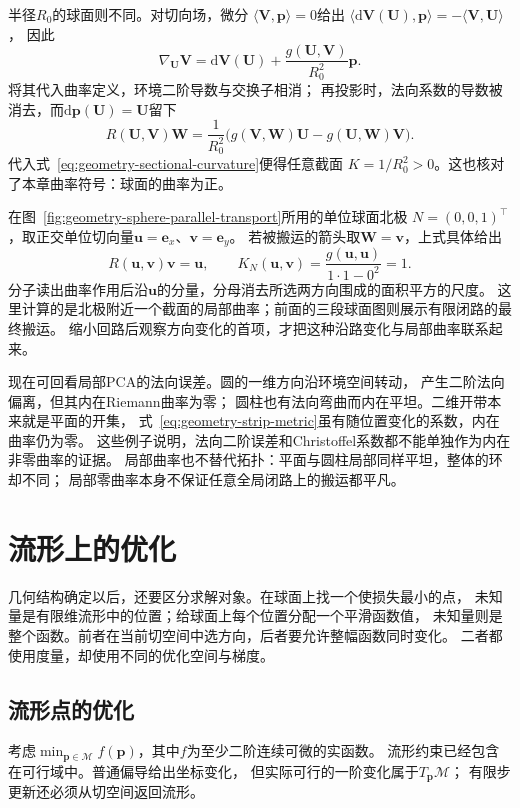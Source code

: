 半径$R_0$的球面则不同。对切向场，微分
$\langle\bm V,\bm p\rangle=0$给出
$\langle\mathrm d\bm V(\bm U),\bm p\rangle=-\langle\bm V,\bm U\rangle$，
因此
\[
 \nabla_{\bm U}\bm V
 =\mathrm d\bm V(\bm U)+\frac{g(\bm U,\bm V)}{R_0^2}\bm p.
\]
将其代入曲率定义，环境二阶导数与交换子相消；
再投影时，法向系数的导数被消去，而$\mathrm d\bm p(\bm U)=\bm U$留下
\[
 R(\bm U,\bm V)\bm W
 =\frac1{R_0^2}\bigl(g(\bm V,\bm W)\bm U-g(\bm U,\bm W)\bm V\bigr).
\]
代入式~\eqref{eq:geometry-sectional-curvature}便得任意截面
$K=1/R_0^2>0$。这也核对了本章曲率符号：球面的曲率为正。

在图~\ref{fig:geometry-sphere-parallel-transport}所用的单位球面北极
$N=(0,0,1)^\top$，取正交单位切向量$\bm u=\bm e_x$、$\bm v=\bm e_y$。
若被搬运的箭头取$\bm W=\bm v$，上式具体给出
\[
 R(\bm u,\bm v)\bm v=\bm u,\qquad
 K_N(\bm u,\bm v)=
 \frac{g(\bm u,\bm u)}{1\cdot1-0^2}=1.
\]
分子读出曲率作用后沿$\bm u$的分量，分母消去所选两方向围成的面积平方的尺度。
这里计算的是北极附近一个截面的局部曲率；前面的三段球面图则展示有限闭路的最终搬运。
缩小回路后观察方向变化的首项，才把这种沿路变化与局部曲率联系起来。

现在可回看局部PCA的法向误差。圆的一维方向沿环境空间转动，
产生二阶法向偏离，但其内在Riemann曲率为零；
圆柱也有法向弯曲而内在平坦。二维开带本来就是平面的开集，
式~\eqref{eq:geometry-strip-metric}虽有随位置变化的系数，内在曲率仍为零。
这些例子说明，法向二阶误差和Christoffel系数都不能单独作为内在非零曲率的证据。
局部曲率也不替代拓扑：平面与圆柱局部同样平坦，整体的环却不同；
局部零曲率本身不保证任意全局闭路上的搬运都平凡。

\section{流形上的优化}
\label{sec:geometry-manifold-optimization}

几何结构确定以后，还要区分求解对象。在球面上找一个使损失最小的点，
未知量是有限维流形中的位置；给球面上每个位置分配一个平滑函数值，
未知量则是整个函数。前者在当前切空间中选方向，后者要允许整幅函数同时变化。
二者都使用度量，却使用不同的优化空间与梯度。

\subsection{流形点的优化}
\label{sec:geometry-point-optimization}

考虑$\min_{\bm p\in\mathcal M}f(\bm p)$，其中$f$为至少二阶连续可微的实函数。
流形约束已经包含在可行域中。普通偏导给出坐标变化，
但实际可行的一阶变化属于$T_{\bm p}\mathcal M$；
有限步更新还必须从切空间返回流形。

